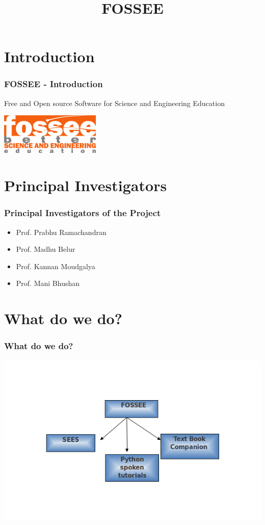 \documentclass{beamer}
\title{FOSSEE}
\institute[IIT Bombay] {IIT Bombay}
\date{}
\begin{document}
\begin{frame}
  \maketitle  
\end{frame}


\section{Introduction}
\begin{frame}
  \frametitle{{FOSSEE} - Introduction}
  Free and Open source Software for Science and Engineering Education 
  \begin{center}
  	\includegraphics[scale=2]{fossee.png} \\
  \end{center}
\end{frame}

\section{Principal Investigators}
\begin{frame}
  \frametitle{Principal Investigators of the Project}
  \begin{itemize}
  \item Prof. Prabhu Ramachandran
  \item Prof. Madhu Belur
  \item Prof. Kannan Moudgalya
  \item Prof. Mani Bhushan
  \end{itemize}
\end{frame}


\section{What do we do?}
\begin{frame}
  \frametitle{What do we do?}
  \begin{center}
  	\includegraphics[scale=0.5]{st.png}
  \end{center}
\end{frame}
\end{document}
